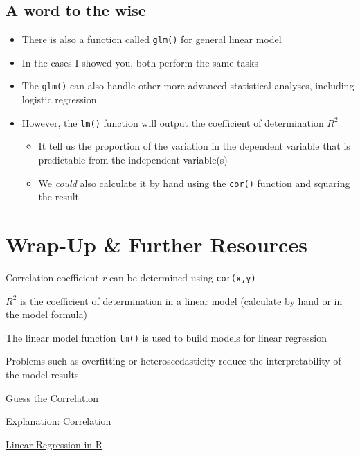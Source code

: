 \documentclass[
]{book}
\providecommand{\tightlist}{%
  \setlength{\itemsep}{0pt}\setlength{\parskip}{0pt}}
\begin{document}
\subsection{A word to the wise}\label{a-word-to-the-wise}

\begin{itemize}
\tightlist
\item
  There is also a function called \texttt{glm()} for general linear model
\item
  In the cases I showed you, both perform the same tasks
\item
  The \texttt{glm()} can also handle other more advanced statistical analyses, including logistic regression
\item
  However, the \texttt{lm()} function will output the coefficient of determination \(R^2\)

  \begin{itemize}
  \tightlist
  \item
    It tell us the proportion of the variation in the dependent variable that is predictable from the independent variable(s)
  \item
    We \emph{could} also calculate it by hand using the \texttt{cor()} function and squaring the result
  \end{itemize}
\end{itemize}

\section*{Wrap-Up \& Further Resources}\label{wrap-up-further-resources-7}

Correlation coefficient \emph{r} can be determined using \texttt{cor(x,y)}

\(R^2\) is the coefficient of determination in a linear model (calculate by hand or in the model formula)

The linear model function \texttt{lm()} is used to build models for linear regression

Problems such as overfitting or heteroscedasticity reduce the interpretability of the model results

\href{https://www.guessthecorrelation.com/}{Guess the Correlation}

\href{https://statisticsbyjim.com/basics/correlation-coefficient-formula/}{Explanation: Correlation}

\href{https://www.datacamp.com/tutorial/linear-regression-R}{Linear Regression in R}
\end{document}
